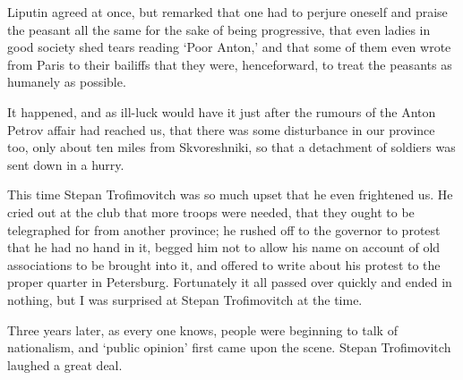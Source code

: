 \documentclass[12pt]{article}
\begin{document}
\vspace{12pt}
Liputin agreed at once, but remarked that one had to perjure oneself and
praise the peasant all the same for the sake of being progressive, that
even ladies in good society shed tears reading `Poor Anton,' and that
some of them even wrote from Paris to their bailiffs that they were,
henceforward, to treat the peasants as humanely as possible.


\vspace{12pt}
It happened, and as ill-luck would have it just after the rumours of the
Anton Petrov affair had reached us, that there was some disturbance
in our province too, only about ten miles from Skvoreshniki, so that a
detachment of soldiers was sent down in a hurry.


\vspace{12pt}
This time Stepan Trofimovitch was so much upset that he even frightened
us. He cried out at the club that more troops were needed, that they
ought to be telegraphed for from another province; he rushed off to the
governor to protest that he had no hand in it, begged him not to allow
his name on account of old associations to be brought into it, and
offered to write about his protest to the proper quarter in Petersburg.
Fortunately it all passed over quickly and ended in nothing, but I was
surprised at Stepan Trofimovitch at the time.


\vspace{12pt}
Three years later, as every one knows, people were beginning to talk
of nationalism, and `public opinion' first came upon the scene. Stepan
Trofimovitch laughed a great deal.
\end{document}
